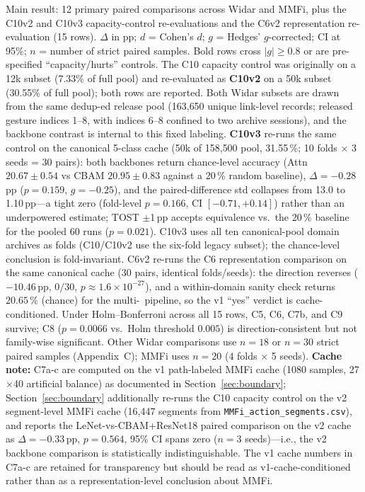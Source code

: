 \documentclass[11pt]{article}
\theoremstyle{definition}
\newcommand{\Rx}{\text{Rx}}
\begin{document}
\begin{table}[!t]
    \centering
    \caption{Main result: 12 primary paired comparisons across Widar and MMFi, plus the C10v2 and C10v3 capacity-control re-evaluations and the C6v2 representation re-evaluation (15 rows). $\Delta$ in pp; $d$ = Cohen's $d$; $g$ = Hedges' $g$-corrected; CI at 95\%; $n$ = number of strict paired samples. Bold rows cross $|g| \geq 0.8$ or are pre-specified ``capacity/hurts'' controls. The C10 capacity control was originally on a 12k subset (7.33\% of full pool) and re-evaluated as \textbf{C10v2} on a 50k subset (30.55\% of full pool); both rows are reported. Both Widar subsets are drawn from the same dedup-ed release pool (163{,}650 unique link-level records; released gesture indices 1--8, with indices 6--8 confined to two archive sessions), and the backbone contrast is internal to this fixed labeling. \textbf{C10v3} re-runs the same control on the canonical 5-class cache (50k of 158{,}500 pool, 31.55\,\%; 10 folds $\times$ 3 seeds = 30 pairs): both backbones return chance-level accuracy (Attn $20.67 \pm 0.54$ vs CBAM $20.95 \pm 0.83$ against a 20\,\% random baseline), $\Delta = -0.28$\,pp ($p = 0.159$, $g = -0.25$), and the paired-difference std collapses from 13.0 to 1.10\,pp---a tight zero (fold-level $p = 0.166$, CI $[-0.71, +0.14]$) rather than an underpowered estimate; TOST $\pm$1\,pp accepts equivalence vs.\ the 20\,\% baseline for the pooled 60 runs ($p = 0.021$). C10v3 uses all ten canonical-pool domain archives as folds (C10/C10v2 use the six-fold legacy subset); the chance-level conclusion is fold-invariant. C6v2 re-runs the C6 representation comparison on the same canonical cache (30 pairs, identical folds/seeds): the direction reverses ($-10.46$\,pp, $0/30$, $p \approx 1.6\times10^{-27}$), and a within-domain sanity check returns $20.65\,\%$ (chance) for the multi-\Rx\ pipeline, so the v1 ``yes'' verdict is cache-conditioned. Under Holm--Bonferroni across all 15 rows, C5, C6, C7b, and C9 survive; C8 ($p = 0.0066$ vs.\ Holm threshold $0.005$) is direction-consistent but not family-wise significant. Other Widar comparisons use $n = 18$ or $n = 30$ strict paired samples (Appendix~C); MMFi uses $n = 20$ (4 folds $\times$ 5 seeds). \textbf{Cache note:} C7a-c are computed on the v1 path-labeled MMFi cache (1080 samples, 27$\times$40 artificial balance) as documented in Section~\ref{sec:boundary}; Section~\ref{sec:boundary} additionally re-runs the C10 capacity control on the v2 segment-level MMFi cache (16,447 segments from \texttt{MMFi\_action\_segments.csv}), and reports the LeNet-vs-CBAM+ResNet18 paired comparison on the v2 cache as $\Delta = -0.33$\,pp, $p = 0.564$, 95\% CI spans zero ($n = 3$ seeds)---i.e., the v2 backbone comparison is statistically indistinguishable. The v1 cache numbers in C7a-c are retained for transparency but should be read as v1-cache-conditioned rather than as a representation-level conclusion about MMFi.}

\end{table}
\end{document}
